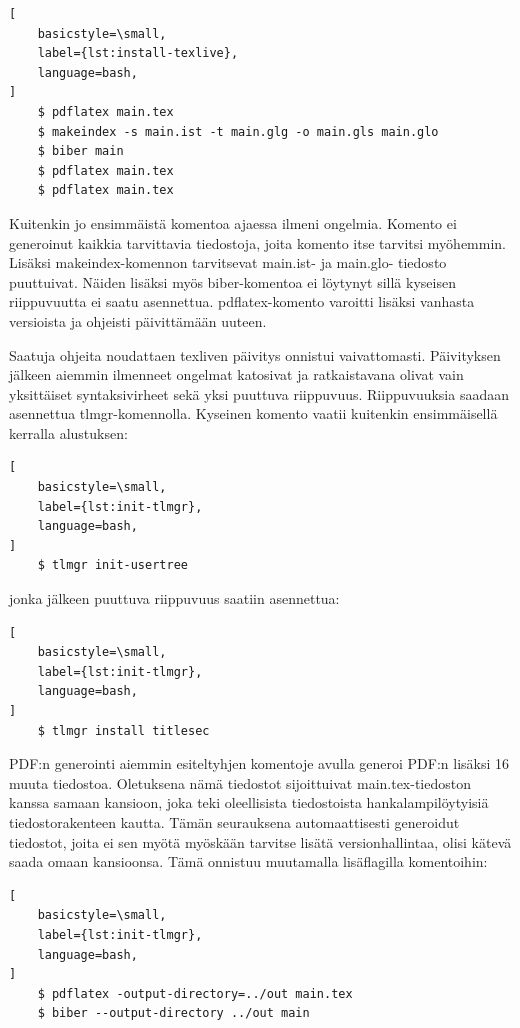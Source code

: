 \begin{lstlisting}[
    basicstyle=\small,
    label={lst:install-texlive},
    language=bash,
]
    $ pdflatex main.tex
    $ makeindex -s main.ist -t main.glg -o main.gls main.glo
    $ biber main
    $ pdflatex main.tex
    $ pdflatex main.tex
\end{lstlisting}

Kuitenkin jo ensimmäistä komentoa ajaessa ilmeni ongelmia. Komento ei
generoinut kaikkia tarvittavia tiedostoja, joita komento itse tarvitsi
myöhemmin. Lisäksi makeindex-komennon tarvitsevat main.ist- ja main.glo-
tiedosto puuttuivat. Näiden lisäksi myös biber-komentoa ei löytynyt sillä
kyseisen riippuvuutta ei saatu asennettua. pdflatex-komento varoitti lisäksi
vanhasta versioista ja ohjeisti päivittämään uuteen.

Saatuja ohjeita \parencite{TeXLiveQuickInstall} noudattaen texliven päivitys
onnistui vaivattomasti. Päivityksen jälkeen aiemmin ilmenneet ongelmat
katosivat ja ratkaistavana olivat vain yksittäiset syntaksivirheet sekä
yksi puuttuva riippuvuus. Riippuvuuksia saadaan asennettua tlmgr-komennolla.
Kyseinen komento vaatii kuitenkin ensimmäisellä kerralla alustuksen:

\begin{lstlisting}[
    basicstyle=\small,
    label={lst:init-tlmgr},
    language=bash,
]
    $ tlmgr init-usertree
\end{lstlisting}

jonka jälkeen puuttuva riippuvuus saatiin asennettua:

\begin{lstlisting}[
    basicstyle=\small,
    label={lst:init-tlmgr},
    language=bash,
]
    $ tlmgr install titlesec
\end{lstlisting}

PDF:n generointi aiemmin esiteltyhjen komentoje avulla generoi PDF:n lisäksi 16
muuta tiedostoa. Oletuksena nämä tiedostot sijoittuivat main.tex-tiedoston
kanssa samaan kansioon, joka teki oleellisista tiedostoista hankalampilöytyisiä
tiedostorakenteen kautta. Tämän seurauksena automaattisesti generoidut
tiedostot, joita ei sen myötä myöskään tarvitse lisätä versionhallintaa, olisi
kätevä saada omaan kansioonsa. Tämä onnistuu muutamalla lisäflagilla
komentoihin:

\begin{lstlisting}[
    basicstyle=\small,
    label={lst:init-tlmgr},
    language=bash,
]
    $ pdflatex -output-directory=../out main.tex
    $ biber --output-directory ../out main
\end{lstlisting}

